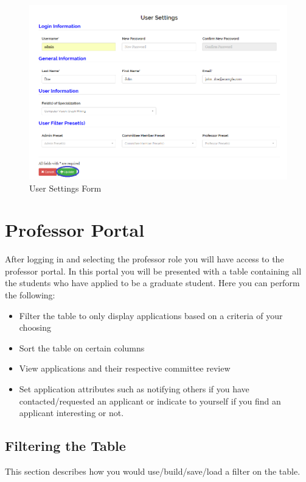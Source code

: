 \documentclass[fontsize=12pt,paper=letter,twoside]{scrartcl}
\begin{document}
\begin{figure}[!htb]
\begin{center}
\includegraphics[width=.99\textwidth]{images/settings_form.png}
\end{center}
\caption{User Settings Form}
\label{fig:settings_form}
\end{figure}

\clearpage
\section{Professor Portal}
After logging in and selecting the professor role you will have access to the professor portal. In this portal you will be presented with a table containing all the students who have applied to be a graduate student. Here you can perform the following:
\begin{itemize}
\item Filter the table to only display applications based on a criteria of your choosing
\item Sort the table on certain columns
\item View applications and their respective committee review
\item Set application attributes such as notifying others if you have contacted/requested an applicant or indicate to yourself if you find an applicant interesting or not.
\end{itemize} 
\subsection{Filtering the Table}
This section describes how you would use/build/save/load a filter on the table.
\end{document}

